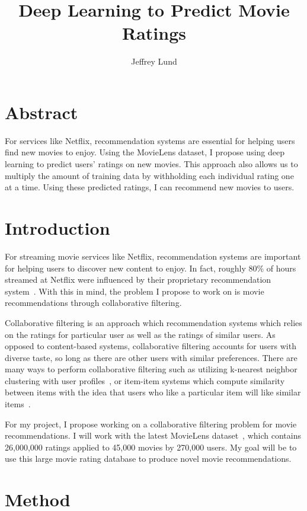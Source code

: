 \documentclass[12pt]{article}
\title{Deep Learning to Predict Movie Ratings}
\author{Jeffrey Lund}
\date{}
\begin{document}
\maketitle

\section*{Abstract}

For services like Netflix, recommendation systems are essential for helping
users find new movies to enjoy.
Using the MovieLens dataset, I propose using deep learning to predict users'
ratings on new movies.
This approach also allows us to multiply the amount of training data by
withholding each individual rating one at a time.
Using these predicted ratings, I can recommend new movies to users.

\clearpage

\section{Introduction}

For streaming movie services like Netflix, recommendation systems are
important for helping users to discover new content to enjoy.
In fact, roughly 80\% of hours streamed at Netflix were influenced by their
proprietary recommendation system~\cite{netflix}.
With this in mind, the problem I propose to work on is movie recommendations
through collaborative filtering.

Collaborative filtering is an approach which recommendation systems which
relies on the ratings for particular user as well as the ratings
of similar users.
As opposed to content-based systems, collaborative filtering accounts for
users with diverse taste, so long as there are other users with similar
preferences.
There are many ways to perform collaborative filtering such as utilizing
k-nearest neighbor clustering with user profiles~\cite{user-user}, or
item-item systems which compute similarity between items with the idea that
users who like a particular item will like similar items~\cite{item-item}.

For my project, I propose working on a collaborative filtering problem for
movie recommendations.
I will work with the latest MovieLens dataset~\cite{movielens},
which contains 26,000,000 ratings applied to 45,000 movies by
270,000 users.
My goal will be to use this large movie rating database to produce novel movie
recommendations.

\section{Method}
\end{document}
